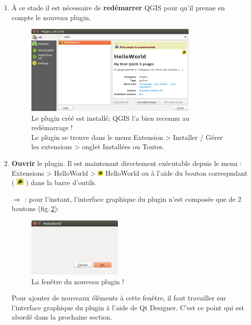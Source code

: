 \documentclass[11pt]{article}
\begin{document}
\begin{enumerate}
\item À ce stade il est nécessaire de \textbf{redémarrer} QGIS pour qu'il prenne en compte le nouveau plugin.

\begin{figure}[H]
  	\centering		
	\includegraphics[width=0.8\textwidth]{hello2018_plugin.png}
	\caption[Le plugin créé est installé; QGIS l'a bien reconnu au redémarrage !]{Le plugin créé est installé; QGIS l'a bien reconnu au redémarrage !\\
	Le plugin se trouve dans le menu \og{}Extension > Installer / Gérer les extensions\fg{} > onglet \og{}Installées\fg{} ou \og{}Toutes\fg{}.}
	\label{hello2018}
\end{figure}


\item \textbf{Ouvrir} le plugin. Il est maintenant directement exécutable depuis le menu :\\
\og{}Extensions > HelloWorld > \includegraphics[width=0.76em]{hello2018_icon.png} HelloWorld\fg{} ou à l'aide du bouton correspndant ( \includegraphics[width=1em]{hello2018_icon.png} ) dans la barre d'outils.


$\Rightarrow$ \underline{}: pour l'instant, l'interface graphique du plugin n'est composée que de 2 boutons (fig.\,\ref{plugin_buttons}):

\vspace*{-0.8em}
\begin{figure}[H]
    \centering
    \includegraphics[width=0.44\textwidth]{hello2018.png}
    \vspace*{-0.8em}
    \caption{La fenêtre du nouveau plugin !}
    \label{plugin_buttons}
\end{figure}
\vspace*{-0.64em}

Pour ajouter de nouveaux éléments à cette fenêtre, il faut travailler sur l'interface graphique du plugin à l'aide de Qt Designer. C'est ce point qui est abordé dans la prochaine section.

\end{enumerate}
\end{document}
